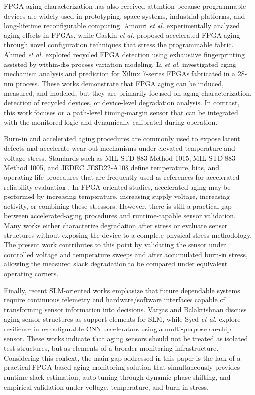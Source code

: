 \documentclass[a4paper,10pt,twoside,twocolumn,final]{JICS_LaTexGuidelines}
\begin{document}
FPGA aging characterization has also received attention because programmable devices are widely used in prototyping, space systems, industrial platforms, and long-lifetime reconfigurable computing. Amouri \textit{et al.} \cite{aging_effects_fpga_amouri} experimentally analyzed aging effects in FPGAs, while Gaskin \textit{et al.} \cite{short_circuit_aging} proposed accelerated FPGA aging through novel configuration techniques that stress the programmable fabric. Ahmed \textit{et al.} \cite{WID} explored recycled FPGA detection using exhaustive fingerprinting assisted by within-die process variation modeling. Li \textit{et al.} \cite{Li2022FPGAAgingPrediction} investigated aging mechanism analysis and prediction for Xilinx 7-series FPGAs fabricated in a 28-nm process. These works demonstrate that FPGA aging can be induced, measured, and modeled, but they are primarily focused on aging characterization, detection of recycled devices, or device-level degradation analysis. In contrast, this work focuses on a path-level timing-margin sensor that can be integrated with the monitored logic and dynamically calibrated during operation.

Burn-in and accelerated aging procedures are commonly used to expose latent defects and accelerate wear-out mechanisms under elevated temperature and voltage stress. Standards such as MIL-STD-883 Method 1015, MIL-STD-883 Method 1005, and JEDEC JESD22-A108 define temperature, bias, and operating-life procedures that are frequently used as references for accelerated reliability evaluation \cite{milstd883_1015,milstd1005SSL,jedecA108D}. In FPGA-oriented studies, accelerated aging may be performed by increasing temperature, increasing supply voltage, increasing activity, or combining these stressors. However, there is still a practical gap between accelerated-aging procedures and runtime-capable sensor validation. Many works either characterize degradation after stress or evaluate sensor structures without exposing the device to a complete physical stress methodology. The present work contributes to this point by validating the sensor under controlled voltage and temperature sweeps and after accumulated burn-in stress, allowing the measured slack degradation to be compared under equivalent operating corners.

Finally, recent SLM-oriented works emphasize that future dependable systems require continuous telemetry and hardware/software interfaces capable of transforming sensor information into decisions. Vargas and Balakrishnan \cite{vargas_and_buff} discuss aging-sensor structures as support elements for SLM, while Syed \textit{et al.} \cite{CNNfabian} explore resilience in reconfigurable CNN accelerators using a multi-purpose on-chip sensor. These works indicate that aging sensors should not be treated as isolated test structures, but as elements of a broader monitoring infrastructure. Considering this context, the main gap addressed in this paper is the lack of a practical FPGA-based aging-monitoring solution that simultaneously provides runtime slack estimation, auto-tuning through dynamic phase shifting, and empirical validation under voltage, temperature, and burn-in stress.
\end{document}
